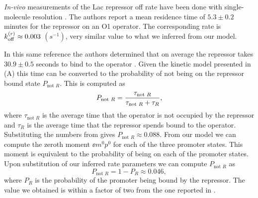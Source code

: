 {\it In-vivo} measurements of the Lac repressor off rate have been done with
single-molecule resolution \cite{Hammar2014}. The authors report a mean
residence time of $5.3 \pm 0.2$ minutes for the repressor on an O1 operator.
The corresponding rate is $k^{(r)}_{\text{off}} \approx 0.003$ $(s^{-1})$, very similar value
to what we inferred from our model.

In this same reference the authors determined that on average the repressor
takes $30.9 \pm 0.5$ seconds to bind to the operator \cite{Hammar2014}. Given
the kinetic model presented in (A) this time can be
converted to the probability of not being on the repressor bound state
$P_{\text{not }R}$. This is computed as
\begin{equation}
  P_{\text{not }R} = {\tau_{\text{not }R} \over
                      \tau_{\text{not }R} + \tau_{R}},
\end{equation}
where $\tau_{\text{not }R}$ is the average time that the operator is not
occupied by the repressor and $\tau_{R}$ is the average time that the repressor
spends bound to the operator. Substituting the numbers from \cite{Hammar2014}
gives $P_{\text{not }R} \approx 0.088$. From our model we can compute the zeroth
moment $\ee{m^0 p^0}$ for each of the three promoter states. This moment is
equivalent to the probability of being on each of the promoter states. Upon
substitution of our inferred rate parameters we can compute $P_{\text{not }R}$
as
\begin{equation}
  P_{\text{not }R} = 1 - P_R \approx 0.046,
\end{equation}
where $P_R$ is the probability of the promoter being bound by the repressor. The
value we obtained is within a factor of two from the one reported in
\cite{Hammar2014}.
